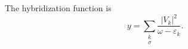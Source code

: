 \documentclass{article}
\begin{document}
The hybridization function is
\begin{equation}
y = \sum_{\substack{k \\ \sigma}} \frac{|V_{k}|^2}{\omega - \varepsilon_{k}} .
\label{eq:hyb}
\end{equation}
\end{document}
